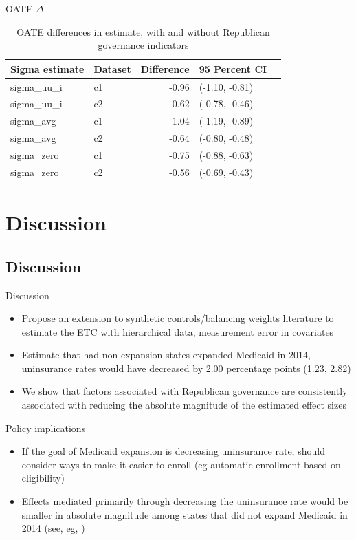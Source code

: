 \documentclass[hyperref={pdfpagelabels=false}]{beamer}
\begin{document}
\begin{frame}{OATE $\Delta$}
\begin{table}[ht]
\centering
\begin{tabular}{llrll}
  \toprule
Sigma estimate & Dataset & Difference & 95 Percent CI\\ 
  \midrule
  sigma\_uu\_i & c1 & -0.96 & (-1.10, -0.81) \\ 
  sigma\_uu\_i & c2 & -0.62 & (-0.78, -0.46) \\ 
  sigma\_avg & c1 & -1.04 & (-1.19, -0.89) \\ 
  sigma\_avg & c2 & -0.64 & (-0.80, -0.48) \\ 
  sigma\_zero & c1 & -0.75 & (-0.88, -0.63) \\ 
  sigma\_zero & c2 & -0.56 & (-0.69, -0.43) \\ 
   \bottomrule
\end{tabular}
\caption{OATE differences in estimate, with and without Republican governance indicators}
\label{tab:oaterepubdiff}
\end{table}
\end{frame}

\section{Discussion}

\subsection{Discussion}

\begin{frame}{Discussion}
\begin{itemize}
    \item Propose an extension to synthetic controls/balancing weights literature to estimate the ETC with hierarchical data, measurement error in covariates \bigskip
    \item Estimate that had non-expansion states expanded Medicaid in 2014, uninsurance rates would have decreased by 2.00 percentage points (1.23, 2.82) \bigskip
    \item We show that factors associated with Republican governance are consistently associated with reducing the absolute magnitude of the estimated effect sizes
\end{itemize}
\end{frame}

\begin{frame}{Policy implications}
    \begin{itemize}
        \item If the goal of Medicaid expansion is decreasing uninsurance rate, should consider ways to make it easier to enroll (eg automatic enrollment based on eligibility) \bigskip
        \item Effects mediated primarily through decreasing the uninsurance rate would be smaller in absolute magnitude among states that did not expand Medicaid in 2014 (see, eg, \cite{wherry2016early}) \bigskip
    \end{itemize}
\end{frame}
\end{document}
